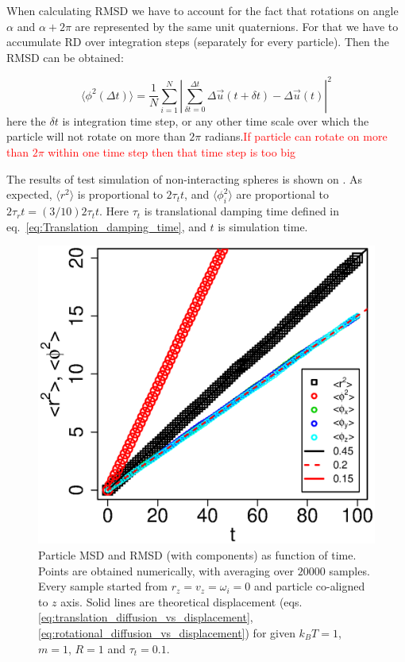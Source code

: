 When calculating RMSD we have to account for the fact that rotations on angle $
\alpha$ and $\alpha + 2\pi$ are represented by the same unit quaternions. For that we have to accumulate RD over integration steps (separately for every particle). Then the RMSD can be obtained:

\begin{equation}
\label{eq:rotational_mean_square_displacement}
	\langle \phi^2 (\Delta t)\rangle
		= \frac{1}{N} \sum_{i=1}^{N} 
			\left|
				\sum_{\delta t = 0}^{\Delta t}
					\Delta \vec{u}(t + \delta t) 
					- \Delta \vec{u}(t)
			\right|^2
\end{equation}
here the $\delta t$ is integration time step, or any other time scale over which the particle will not rotate on more than $2 \pi$ radians.\textcolor{red}{If particle can rotate on more than $2 \pi$ within one time step then that time step is too big}

The results of test simulation of non-interacting spheres is shown on . As expected, $\langle r^2\rangle$ is proportional to $2 \tau_t t$, and $\langle \phi_i^2\rangle$ are proportional to $2 \tau_r t = (3/10) 2 \tau_t t$. Here $\tau_t$ is translational damping time defined in eq.~\eqref{eq:Translation_damping_time}, and $t$ is simulation time.

\begin{figure}[h]
\centering
	\includegraphics[height=0.3\textheight]{Images/DiffusionStats_drift}
	\captionsetup{justification=centering, width=0.9\textwidth}
	\caption{Particle MSD and RMSD (with components) as function of time. Points are obtained numerically, with averaging over $20000$ samples. Every sample started from $r_z = v_z = \omega_i = 0$ and particle co-aligned to $z$ axis. Solid lines are theoretical displacement (eqs. \eqref{eq:translation_diffusion_vs_displacement}, \eqref{eq:rotational_diffusion_vs_displacement}) for given $k_BT = 1$, $m = 1$, $R = 1$ and $\tau_t = 0.1$.}
	\label{fig:diffusion_stats_mean_square_displacement}
\end{figure}

